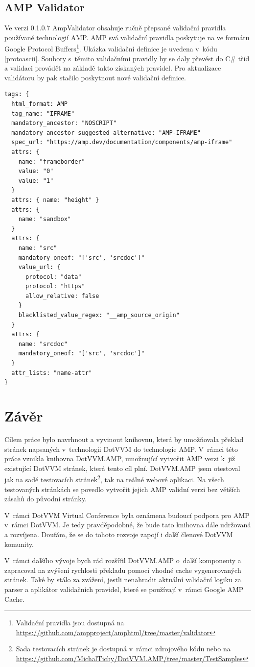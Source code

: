 \section{AMP Validator}
Ve verzi 0.1.0.7 AmpValidator obsahuje ručně přepsané validační pravidla používané technologií AMP. AMP svá validační pravidla poskytuje na ve formátu Google Protocol Buffers\footnote{Validační pravidla jsou dostupná na \url{https://github.com/ampproject/amphtml/tree/master/validator}}. Ukázka validační definice je uvedena v~kódu \ref{protoascii}\cite{validatorGit}.  Soubory s~těmito validačními pravidly by se daly převést do C\# tříd a validaci provádět na základě takto získaných pravidel. Pro aktualizace validátoru by pak stačilo poskytnout nové validační definice.

\begin{lstlisting}[language=html, caption=Ukázka části validačního pravidla pro iframe v~rámci protoascii souboru.,label=protoascii,captionpos=t]
tags: {
  html_format: AMP
  tag_name: "IFRAME"
  mandatory_ancestor: "NOSCRIPT"
  mandatory_ancestor_suggested_alternative: "AMP-IFRAME"
  spec_url: "https://amp.dev/documentation/components/amp-iframe"
  attrs: {
    name: "frameborder"
    value: "0"
    value: "1"
  }
  attrs: { name: "height" }
  attrs: {
    name: "sandbox"
  }
  attrs: {
    name: "src"
    mandatory_oneof: "['src', 'srcdoc']"
    value_url: {
      protocol: "data"
      protocol: "https"
      allow_relative: false
    }
    blacklisted_value_regex: "__amp_source_origin"
  }
  attrs: {
    name: "srcdoc"
    mandatory_oneof: "['src', 'srcdoc']"
  }
  attr_lists: "name-attr"
}
\end{lstlisting}

\chapter{Závěr}
Cílem práce bylo navrhnout a vyvinout knihovnu, která by umožňovala překlad stránek napsaných v~technologii DotVVM do technologie AMP. V~rámci této práce vznikla knihovna DotVVM.AMP, umožnující vytvořit AMP verzi k~již existující DotVVM stránek, která tento cíl plní. DotVVM.AMP jsem otestoval jak na sadě testovacích stránek\footnote{ Sada testovacích stránek je dostupná v~rámci zdrojového kódu nebo na \url{https://github.com/MichalTichy/DotVVM.AMP/tree/master/TestSamples}}, tak na reálné webové aplikaci. Na všech testovaných stránkách se povedlo vytvořit jejich AMP validní verzi bez větších zásahů do původní stránky.

V~rámci DotVVM Virtual Conference byla oznámena budoucí podpora pro AMP v~rámci DotVVM. Je tedy pravděpodobné, že bude tato knihovna dále udržovaná a rozvíjena\cite{herceg_2020}.  Doufám, že se do tohoto rozvoje zapojí i další členové DotVVM komunity.

V~rámci dalšího vývoje bych rád rozšířil DotVVM.AMP o~další komponenty a zapracoval na zvýšení rychlosti překladu pomocí vhodné cache vygenerovaných stránek. Také by stálo za zvážení, jestli nenahradit aktuální validační logiku za parser a aplikátor validačních pravidel, které se používají v~rámci Google AMP Cache.